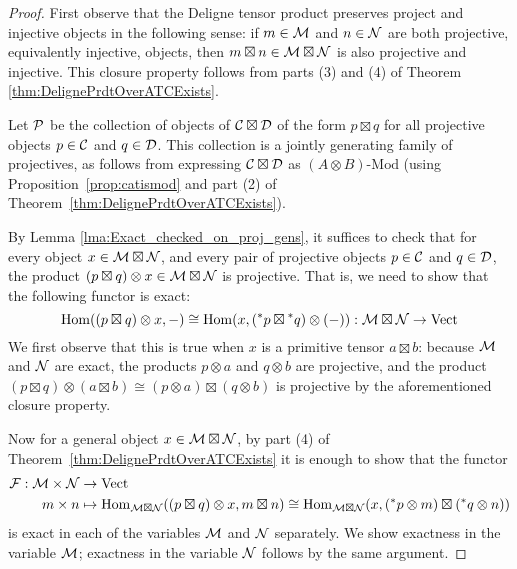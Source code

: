 \documentclass{amsart}
\begin{document}
\begin{proof} 
First observe that the Deligne tensor product preserves project and injective objects in the following sense: if $m \in \mathcal M$ and $n \in \mathcal N$ are both projective, equivalently injective, objects, then $m \boxtimes n \in \mathcal M \boxtimes \mathcal N$ is also projective and injective.  This closure property follows from parts (3) and (4) of Theorem \ref{thm:DelignePrdtOverATCExists}.

Let $\mathcal P$ be the collection of objects of $\mathcal C \boxtimes \mathcal D$ of the form $p \boxtimes q$ for all projective objects $p \in \mathcal C$ and $q \in \mathcal D$.  This collection is a jointly generating family of projectives, as follows from expressing $\mathcal C \boxtimes \mathcal D$ as $(A \otimes B)\textrm{-}\mathrm{Mod}$ (using Proposition~\ref{prop:catismod} and part (2) of Theorem~\ref{thm:DelignePrdtOverATCExists}).

By Lemma \ref{lma:Exact_checked_on_proj_gens}, it suffices to check that for every object $x \in \mathcal M \boxtimes \mathcal N$, and every pair of projective objects $p \in \mathcal C$ and $q \in \mathcal D$, the product $(p \boxtimes q) \otimes x \in \mathcal M \boxtimes \mathcal N$ is projective.  That is, we need to show that the following functor is exact:
\begin{equation*}
	\operatorname{Hom}((p \boxtimes q) \otimes x, -) \cong \operatorname{Hom}(x, ({}^*p \boxtimes {}^*q) \otimes(-) ): \mathcal M \boxtimes \mathcal N \to \mathrm{Vect}
\end{equation*}
We first observe that this is true when $x$ is a primitive tensor $a \boxtimes b$: because $\mathcal M$ and $\mathcal N$ are exact, the products $p \otimes a$ and $q \otimes b$ are projective, and the product $(p \boxtimes q) \otimes (a \boxtimes b) \cong (p \otimes a) \boxtimes (q \otimes b)$ is projective by the aforementioned closure property.

Now for a general object $x \in \mathcal M \boxtimes \mathcal N$, by part (4) of Theorem~\ref{thm:DelignePrdtOverATCExists} it is enough to show that the functor
\begin{align*}
\mathcal F: \mathcal M \times \mathcal N &\rightarrow \mathrm{Vect} \\
m \times n &\mapsto \operatorname{Hom}_{\mathcal M \boxtimes \mathcal N}((p \boxtimes q) \otimes x, m \boxtimes n) \cong \operatorname{Hom}_{\mathcal M \boxtimes \mathcal N}(x, ({}^* p \otimes m) \boxtimes ({}^* q \otimes n))
\end{align*}
is exact in each of the variables $\mathcal M$ and $\mathcal N$ separately.  We show exactness in the variable $\mathcal M$; exactness in the variable $\mathcal N$ follows by the same argument.


\end{proof}
\end{document}
